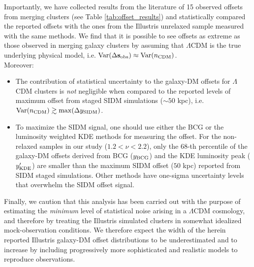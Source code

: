 \documentclass[usenatbib]{mn2e}
\newcommand{\offset}{\Delta {\bf s}}
\newcommand{\SIDM}{{\rm SIDM}}
\newcommand{\Var}{\mathrm{Var}}
\begin{document}
{Importantly, we have collected results from the literature of 15 observed offsets from merging clusters (see Table \ref{tab:offset_results}) and statistically compared the reported offsets with the ones from the Illustris unrelaxed sample measured with the same methods. We find that it is possible to see offsets as extreme as those observed in merging galaxy clusters by assuming that $\Lambda$CDM is the true underlying physical model, i.e. $\Var(\offset_{\rm obs}) \approx \Var(n_{\rm CDM})$.\\	

Moreover: 
\begin{itemize}

		\item The contribution of statistical uncertainty to the galaxy-DM offsets 
			for $\Lambda$CDM clusters is {\it not} negligible when compared to the reported  
			levels of maximum offset from staged SIDM simulations ($\sim 50$ kpc),
			i.e. $\Var(n_{\rm CDM}) \gtrsim \max(\Delta y_{\SIDM})$.\\
		
		\item To maximize the SIDM signal, one should use either the BCG or the
			luminosity weighted KDE methods for measuring the offset.
			For the non-relaxed samples in our study ($1.2 < \nu < 2.2$),
		  only the 68-th percentile of the galaxy-DM offsets derived from BCG ($y_{\rm BCG}$) and 
			the KDE luminosity peak	($y_{\rm KDE}'$)
			are smaller than the maximum SIDM offset ($50$ kpc) reported from SIDM staged simulations. 
			Other methods have one-sigma uncertainty levels that overwhelm the
			SIDM offset signal. 


\end{itemize}

Finally, we caution that this analysis has been carried out with the purpose of estimating the {\it minimum} level of statistical noise arising in a $\Lambda$CDM cosmology, and therefore by treating the Illustris simulated clusters in somewhat idealized mock-observation conditions. We therefore expect the width of the herein reported Illustris galaxy-DM offset distributions to be underestimated and to increase by including progressively more sophisticated and realistic models to reproduce observations. 

}
\end{document}

